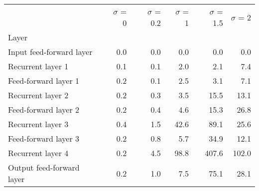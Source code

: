 \begin{tabular}{lrrrrr}
\toprule
{} &  $\sigma$  = 0 &  $\sigma$  = 0.2 &  $\sigma$  = 1 &  $\sigma$  = 1.5 &  $\sigma$  = 2 \\
Layer                     &                &                  &                &                  &                \\
\midrule
Input feed-forward layer  &            0.0 &              0.0 &            0.0 &              0.0 &            0.0 \\
Recurrent layer 1         &            0.1 &              0.1 &            2.0 &              2.1 &            7.4 \\
Feed-forward layer 1      &            0.2 &              0.1 &            2.5 &              3.1 &            7.1 \\
Recurrent layer 2         &            0.2 &              0.3 &            3.5 &             15.5 &           13.1 \\
Feed-forward layer 2      &            0.2 &              0.4 &            4.6 &             15.3 &           26.8 \\
Recurrent layer 3         &            0.4 &              1.5 &           42.6 &             89.1 &           25.6 \\
Feed-forward layer 3      &            0.2 &              0.8 &            5.7 &             34.9 &           12.1 \\
Recurrent layer 4         &            0.2 &              4.5 &           98.8 &            407.6 &          102.0 \\
Output feed-forward layer &            0.2 &              1.0 &            7.5 &             75.1 &           28.1 \\
\bottomrule
\end{tabular}
